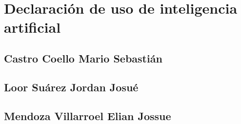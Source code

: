 \documentclass[11pt,a4paper]{article}
\begin{document}
\section{Declaración de uso de inteligencia artificial}

\subsection{Castro Coello Mario Sebastián}
\noindent

\subsection{Loor Suárez Jordan Josué}
\noindent

\subsection{Mendoza Villarroel Elian Jossue}
\noindent

\printbibliography[heading=bibintoc,title={Referencias}]
\end{document}
